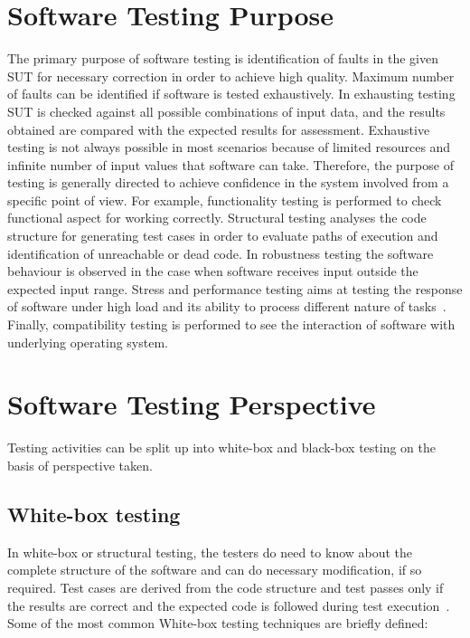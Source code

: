 \section{Software Testing Purpose}
The primary purpose of software testing is identification of faults in the given SUT for necessary correction in order to achieve high quality. Maximum number of faults can be identified if software is tested exhaustively. In exhausting testing SUT is checked against all possible combinations of input data, and the results obtained are compared with the expected results for assessment. Exhaustive testing is not always possible in most scenarios because of limited resources and infinite number of input values that software can take. Therefore, the purpose of testing is generally directed to achieve confidence in the system involved from a specific point of view. For example, functionality testing is performed to check functional aspect for working correctly. Structural testing analyses the code structure for generating test cases in order to evaluate paths of execution and identification of unreachable or dead code. In robustness testing the software behaviour is observed in the case when software receives input outside the expected input range. Stress and performance testing aims at testing the response of software under high load and its ability to process different nature of tasks~\cite{cohen2005robustness}. Finally, compatibility testing is performed to see the interaction of software with underlying operating system.

\section{Software Testing Perspective}
Testing activities can be split up into white-box and black-box testing on the basis of perspective taken. 

\subsection{White-box testing}
In white-box or structural testing, the testers do need to know about the complete structure of the software and can do necessary modification, if so required. Test cases are derived from the code structure and test passes only if the results are correct and the expected code is followed during test execution~\cite{ostrand2002white}. Some of the most common White-box testing techniques are briefly defined:

